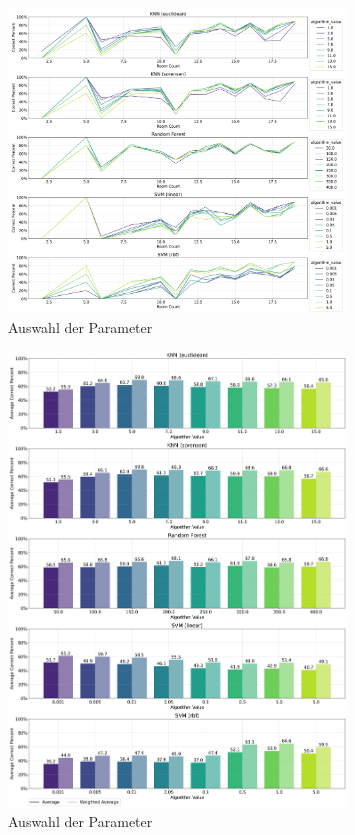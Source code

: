 
\begin{figure}[H]
    \centering
    \includegraphics[width=0.8\textwidth]{images/2_best_parameters_01.png}
    \caption{Auswahl der Parameter}
    \label{fig:2_best_parameters_01}
\end{figure}

\begin{figure}[H]
    \centering
    \includegraphics[width=0.8\textwidth]{images/2_best_parameters_02.png}
    \caption{Auswahl der Parameter}
    \label{fig:2_best_parameters_02}
\end{figure}

